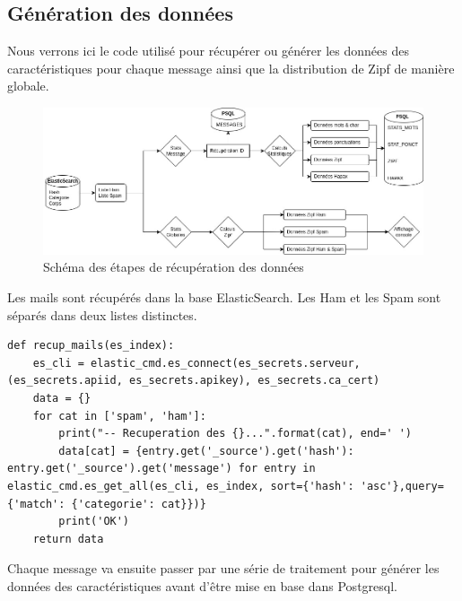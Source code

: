 \documentclass[a4paper,12pt]{article}
\begin{document}
	\subsection{Génération des données}
		Nous verrons ici le code utilisé pour récupérer ou générer les données des caractéristiques pour chaque message ainsi que la distribution de Zipf de manière globale.
		\begin{figure}[H]
			\includegraphics[width=\linewidth]{img/SchemaPhase2.jpg}
			\caption{Schéma des étapes de récupération des données}
		\end{figure}
		
		Les mails sont récupérés dans la base ElasticSearch. Les Ham et les Spam sont séparés dans deux listes distinctes.
		\begin{lstlisting}[title=Récupération des messages dans la base ES]
def recup_mails(es_index):
    es_cli = elastic_cmd.es_connect(es_secrets.serveur, (es_secrets.apiid, es_secrets.apikey), es_secrets.ca_cert)
    data = {}
    for cat in ['spam', 'ham']:
        print("-- Recuperation des {}...".format(cat), end=' ')
        data[cat] = {entry.get('_source').get('hash'): entry.get('_source').get('message') for entry in elastic_cmd.es_get_all(es_cli, es_index, sort={'hash': 'asc'},query={'match': {'categorie': cat}})}
        print('OK')
    return data		
		\end{lstlisting}
		
		Chaque message va ensuite passer par une série de traitement pour générer les données des caractéristiques avant d'être mise en base dans Postgresql. 
		
\end{document}
